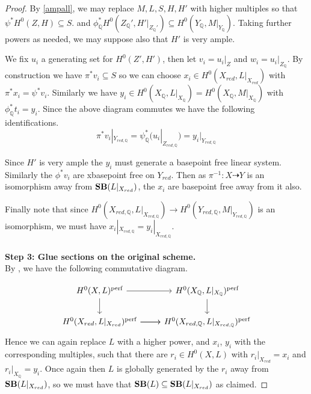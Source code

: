 \begin{proof}
	By \autoref{ampall}, we may replace $M,L,S,H,H'$ with higher multiples so that $\psi^{*}H^{0}(Z,H)\subseteq S$. and $\phi_{\mathbb{Q}}^{*}H^{0}(Z_{\mathbb{Q}}',H'|_{Z_{\mathbb{Q}}'})\subseteq H^{0}(Y_{\mathbb{Q}},M|_{Y_{\mathbb{Q}}})$. 
	Taking further powers as needed, we may suppose also that $H'$ is very ample.
	
	We fix $u_{i}$ a generating set for $H^{0}(Z',H')$, then let $v_{i}=u_{i}|_{Z}$ and $w_{i}=u_{i}|_{Z_\mathbb{Q}}$. By construction we have $\pi^{*}v_{i}\subseteq S$ so we can choose $x_{i}\in H^{0}(X_{red},L|_{X_{red}})$ with $\pi^{*}x_{i}=\psi^{*}v_{i}$. Similarly we have $y_{i} \in H^{0}(X_{\mathbb{Q}},L|_{X_{\mathbb{Q}}})=H^{0}(X_{\mathbb{Q}},M|_{X_{\mathbb{Q}}})$ with $\phi_{\mathbb{Q}}^{*}t_{i}=y_{i}$. Since the above diagram commutes we have the following identifications. $$\pi^{*}v_{i}|_{Y_{red,\mathbb{Q}}}=\psi_{\mathbb{Q}}^{*}(u_{i}|_{Z_{red,\mathbb{Q}}})=y_{i}|_{Y_{red,\mathbb{Q}}}$$
	
	Since $H'$ is very ample the $y_{i}$ must generate a basepoint free linear system. Similarly the $\phi^{*}v_{i}$ are xbasepoint free on $Y_{red}$. Then as $\pi^{-1}\colon X \dashrightarrow Y$ is an isomorphism away from $\mathbf{SB}(L|_{X_{red}})$, the $x_{i}$ are basepoint free away from it also.
	
	Finally note that since $H^{0}(X_{red,\mathbb{Q}},L|_{X_{red,\mathbb{Q}}}) \to H^{0}(Y_{red,\mathbb{Q}},M|_{Y_{red,\mathbb{Q}}})$ is an isomorphism, we must have $x_{i}|_{X_{red,\mathbb{Q}}}=y_{i}|_{X_{red,\mathbb{Q}}}$.\\
	\\
	\textbf{Step 3: Glue sections on the original scheme.}\\
	
	By \cite[Proposition 3.5]{witaszek2020keels}, we have the following commutative diagram. 
	
	\[
	\begin{tikzcd}
	{H^{0}(X,L)^{\perf}} \arrow[d] \arrow[r]                 & {H^{0}(X_{\mathbb{Q}},L|_{X_{\mathbb{Q}}})^{\perf}} \arrow[d] \\
	{H^{0}(X_{red},L|_{X_{red}})^{\perf}} \arrow[r] \arrow[r] & {H^{0}(X_{red,\mathbb{Q}},L|_{X_{red,\mathbb{Q}}})^{\perf}}  
	\end{tikzcd}	
	\]
	Hence we can again replace $L$ with a higher power, and $x_{i}$, $y_{i}$ with the corresponding multiples, such that there are $r_{i} \in H^{0}(X,L)$ with $r_{i}|_{X_{red}}=x_{i}$ and $r_{i}|_{X_{\mathbb{Q}}}=y_{i}$. Once again then $L$ is globally generated by the $r_{i}$ away from $\mathbf{SB}(L|_{X_{red}})$, so we must have that $\mathbf{SB}(L)\subseteq \mathbf{SB}(L|_{X_{red}})$ as claimed.
\end{proof}

